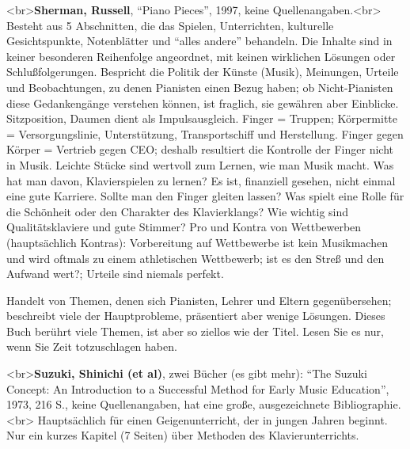\label{Sherman}

<br>\textbf{Sherman, Russell}, \enquote{Piano Pieces}, 1997, keine Quellenangaben.<br>  Besteht aus 5 Abschnitten, die das Spielen, Unterrichten, kulturelle Gesichtspunkte, Notenblätter und \enquote{alles andere} behandeln.
Die Inhalte sind in keiner besonderen Reihenfolge angeordnet, mit keinen wirklichen Lösungen oder Schlußfolgerungen.
Bespricht die Politik der Künste (Musik), Meinungen, Urteile und Beobachtungen, zu denen Pianisten einen Bezug haben; ob Nicht-Pianisten diese Gedankengänge verstehen können, ist fraglich, sie gewähren aber Einblicke.
Sitzposition, Daumen dient als Impulsausgleich.
Finger = Truppen; Körpermitte = Versorgungslinie, Unterstützung, Transportschiff und Herstellung.
Finger gegen Körper = Vertrieb gegen CEO; deshalb resultiert die Kontrolle der Finger nicht in Musik.
Leichte Stücke sind wertvoll zum Lernen, wie man Musik macht.
Was hat man davon, Klavierspielen zu lernen?
Es ist, finanziell gesehen, nicht einmal eine gute Karriere.
Sollte man den Finger gleiten lassen?
Was spielt eine Rolle für die Schönheit oder den Charakter des Klavierklangs?
Wie wichtig sind Qualitätsklaviere und gute Stimmer?
Pro und Kontra von Wettbewerben (hauptsächlich Kontras): Vorbereitung auf Wettbewerbe ist kein Musikmachen und wird oftmals zu einem athletischen Wettbewerb; ist es den Streß und den Aufwand wert?; Urteile sind niemals perfekt.

Handelt von Themen, denen sich Pianisten, Lehrer und Eltern gegenübersehen; beschreibt viele der Hauptprobleme, präsentiert aber wenige Lösungen.
Dieses Buch berührt viele Themen, ist aber so ziellos wie der Titel.
Lesen Sie es nur, wenn Sie Zeit totzuschlagen haben.


\label{Suzuki}

<br>\textbf{Suzuki, Shinichi (et al)}, zwei Bücher (es gibt mehr): \enquote{The Suzuki Concept: An Introduction to a Successful Method for Early Music Education}, 1973, 216 S., keine Quellenangaben, hat eine große, ausgezeichnete Bibliographie.<br>
Hauptsächlich für einen Geigenunterricht, der in jungen Jahren beginnt.
Nur ein kurzes Kapitel (7 Seiten) über Methoden des Klavierunterrichts.

